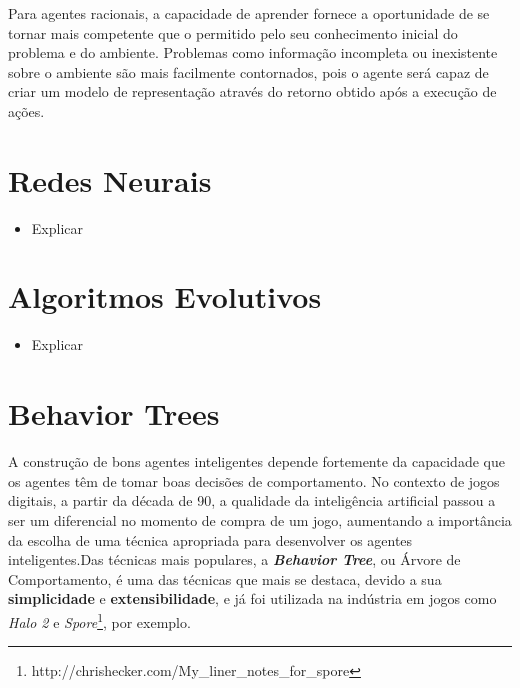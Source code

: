 Para agentes racionais, a capacidade de aprender fornece a oportunidade de se
tornar mais competente que o permitido pelo seu conhecimento inicial do problema
e do ambiente. Problemas como informação incompleta ou inexistente sobre o
ambiente são mais facilmente contornados, pois o agente será capaz de criar um
modelo de representação através do retorno obtido após a execução de ações.


\section{\label{section:neural-networks}Redes Neurais}
\begin{mdframed}[backgroundcolor=green!20]
\begin{itemize}
	\item
		Explicar
\end{itemize}
\end{mdframed}



\section{\label{section:environment}Algoritmos Evolutivos}
\begin{mdframed}[backgroundcolor=green!20]
\begin{itemize}
	\item
		Explicar
\end{itemize}
\end{mdframed}



\section{\label{section:behavior-trees}Behavior Trees}
A construção de bons agentes inteligentes depende fortemente da capacidade que
os agentes têm de tomar boas decisões de comportamento. No contexto de jogos
digitais, a partir da década de 90, a qualidade da inteligência artificial
passou a ser um diferencial no momento de compra de um jogo\cite[Cap.
1]{Millington:2009:AIG:1795711}, aumentando a importância da escolha de uma
técnica apropriada para desenvolver os agentes inteligentes.Das técnicas mais
populares, a \textbf{\textit{Behavior Tree}}, ou Árvore de Comportamento, é uma
das técnicas que mais se destaca, devido a sua \textbf{simplicidade} e
\textbf{extensibilidade}\cite[Cap.  4]{Rabin:2013:GAP:2566761}, e já foi
utilizada na indústria em jogos como \textit{Halo 2}\cite[Cap.
5]{Millington:2009:AIG:1795711} e
\textit{Spore}\footnote{http://chrishecker.com/My\_liner\_notes\_for\_spore},
por exemplo.


